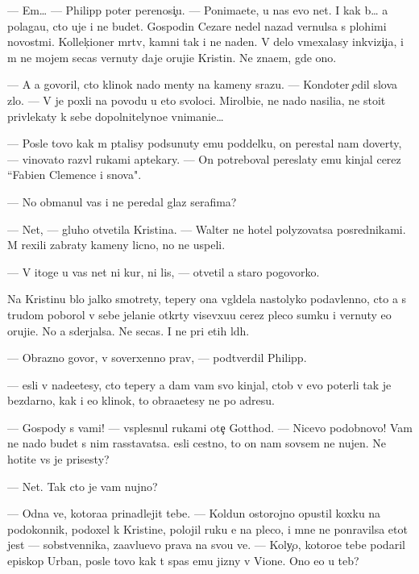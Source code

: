 \documentclass[10pt]{book}
\begin{document}
— Em… — Philipp poter perenosi{\c}u. — Ponima{\y}ete, u nas {\y}evo net. I kak b{\yi}… {\y}a polaga{\y}u, cto uje i ne budet. Gospodin Cezare nedel{\iu} nazad vernulsa s plohimi novost{\ia}mi. Kollek{\c}ioner m{\e}rtv, kamni tak i ne na{\y}den{\yi}. V delo vmexalasy inkvizi{\c}i{\y}a, i m{\yi} ne mojem se{\y}cas vernuty daje oruji{\y}e Kristin{\yi}. Ne zna{\y}em, gde ono.

— A {\y}a govoril, cto klinok nado men{\ia}ty na kameny srazu. — Kondot{\y}er {\c}edil slova zlo. — V{\yi} je poxli na povodu u eto{\y} svoloci. Mirol{\iu}bi{\y}e, ne nado nasili{\y}a, ne sto{\y}it privlekaty k sebe dopolnitelyno{\y}e vnimani{\y}e…

— Posle tovo kak m{\yi} p{\yi}talisy podsunuty {\y}emu poddelku, on perestal nam dover{\ia}ty, — vinovato razv{\e}l rukami aptekary. — On potreboval pereslaty {\y}emu kinjal cerez ``Fabien Clemence i s{\yi}nov{\y}a".

— No obmanul vas i ne peredal glaz serafima?

— Net, — gluho otvetila Kristina. — Walter ne hotel polyzovatsa posrednikami. M{\yi} rexili zabraty kameny licno, no ne uspeli.

— V itoge u vas net ni kur, ni lis{\yi}, — otvetil {\y}a staro{\y} pogovorko{\y}.

Na Kristinu b{\yi}lo jalko smotrety, tepery ona v{\yi}gl{\ia}dela nastolyko podavlenno{\y}, cto {\y}a s trudom poborol v sebe jelani{\y}e otkr{\yi}ty visevxu{\y}u cerez pleco sumku i vernuty {\y}e{\y}o oruji{\y}e. No {\y}a sderjalsa. Ne se{\y}cas. I ne pri etih l{\iu}d{\ia}h.

— Obrazno govor{\ia}, v{\yi} soverxenno prav{\yi}, — podtverdil Philipp.

— {\Y}esli v{\yi} nade{\y}etesy, cto tepery {\y}a dam vam svo{\y} kinjal, ctob{\yi} v{\yi} {\y}evo poter{\ia}li tak je bezdarno, kak i {\y}e{\y}o klinok, to obra{\x}a{\y}etesy ne po adresu.

— Gospody s vami! — vsplesnul rukami ote{\c} Gotthod. — Nicevo podobnovo! Vam ne nado budet s nim rasstavatsa. {\Y}esli cestno, to on nam sovsem ne nujen. Ne hotite vs{\e} je prisesty?

— Net. Tak cto je vam nujno?

— Odna ve{\x}, kotora{\y}a prinadlejit tebe. — Koldun ostorojno opustil koxku na podokonnik, podoxel k Kristine, polojil ruku {\y}e{\y} na pleco, i mne ne ponravilsa etot jest — sobstvennika, za{\y}avl{\ia}{\y}u{\x}evo prava na svo{\y}u ve{\x}. — Koly{\c}o, kotoro{\y}e tebe podaril {\y}episkop Urban, posle tovo kak t{\yi} spas {\y}emu jizny v Vione. Ono {\y}e{\x}o u teb{\ia}?
\end{document}
